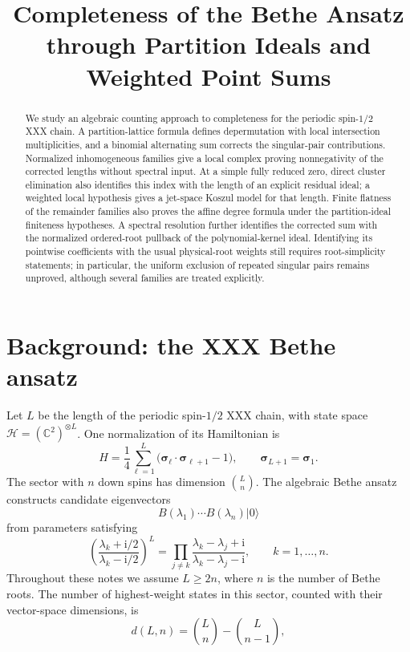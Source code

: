 \documentclass[11pt]{article}
\title{Completeness of the Bethe Ansatz\\through Partition Ideals and Weighted Point Sums}
\author{}
\date{}
\theoremstyle{definition}
\newcommand{\ii}{\mathrm i}
\newcommand{\C}{\mathbb C}
\begin{document}
\maketitle

\begin{abstract}
We study an algebraic counting approach to completeness for the periodic
spin-$1/2$ XXX chain. A partition-lattice formula defines depermutation
with local intersection multiplicities, and a binomial alternating sum
corrects the singular-pair contributions. Normalized inhomogeneous
families give a local complex proving nonnegativity of the corrected
lengths without spectral input. At a simple fully reduced zero, direct
cluster elimination also identifies this index with the length of an
explicit residual ideal; a weighted local hypothesis gives a jet-space
Koszul model for that length. Finite flatness of the remainder
families also proves the affine degree formula under the partition-ideal
finiteness hypotheses. A spectral resolution further identifies the
corrected sum with the normalized ordered-root pullback of the
polynomial-kernel ideal. Identifying its pointwise coefficients with the
usual physical-root weights still requires root-simplicity statements;
in particular, the uniform exclusion of repeated singular pairs remains
unproved, although several families are treated explicitly.
\end{abstract}

\section{Background: the XXX Bethe ansatz}

Let $L$ be the length of the periodic spin-$1/2$ XXX chain, with state space
$\mathcal H=(\C^2)^{\otimes L}$. One normalization of its Hamiltonian is
\[
 H=\frac14\sum_{\ell=1}^L
 \bigl(\boldsymbol{\sigma}_{\ell}\cdot
 \boldsymbol{\sigma}_{\ell+1}-1\bigr),
 \qquad \boldsymbol{\sigma}_{L+1}=\boldsymbol{\sigma}_1.
\]
The sector with $n$ down spins has dimension $\binom Ln$.
The algebraic Bethe ansatz constructs candidate eigenvectors
\[
 B(\lambda_1)\cdots B(\lambda_n)|0\rangle
\]
from parameters satisfying
\begin{equation}\label{eq:bethe}
 \left(\frac{\lambda_k+\ii/2}{\lambda_k-\ii/2}\right)^L
 =
 \prod_{j\ne k}\frac{\lambda_k-\lambda_j+\ii}{\lambda_k-\lambda_j-\ii},
 \qquad k=1,\ldots,n.
\end{equation}
Throughout these notes we assume $L\ge2n$, where $n$ is the number of
Bethe roots. The number of highest-weight states in this
sector, counted with their vector-space dimensions, is
\begin{equation}\label{eq:target}
 d(L,n)=\binom Ln-\binom L{n-1},
\end{equation}
\end{document}
